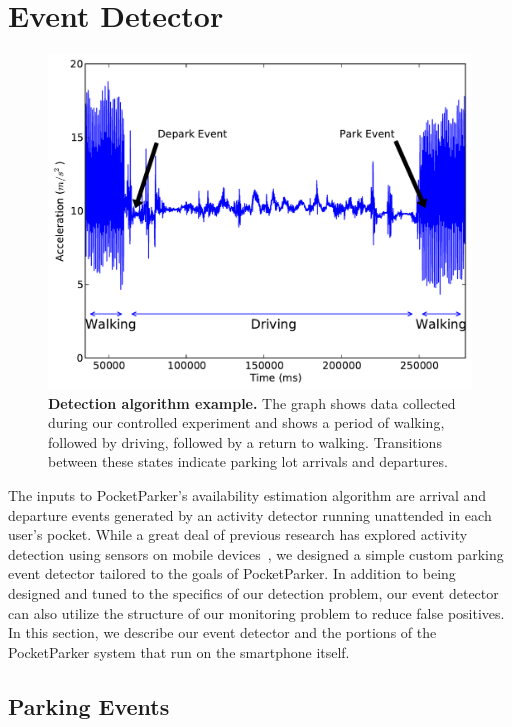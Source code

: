 \section{Event Detector}
\label{sec-detector}

\begin{figure}
\centering
\includegraphics[width=\columnwidth]{./figures/Detection.pdf}

\caption{\textbf{Detection algorithm example.} The graph shows data collected
during our controlled experiment and shows a period of walking, followed by
driving, followed by a return to walking. Transitions between these states
indicate parking lot arrivals and departures.}

\label{fig-detectionexample}
\end{figure}

The inputs to PocketParker's availability estimation algorithm are arrival
and departure events generated by an activity detector running unattended in
each user's pocket. While a great deal of previous research has explored
activity detection using sensors on mobile devices~\cite{FIXME}, we designed a
simple custom parking event detector tailored to the goals of PocketParker.
In addition to being designed and tuned to the specifics of our detection
problem, our event detector can also utilize the structure of our monitoring
problem to reduce false positives. In this section, we describe our event
detector and the portions of the PocketParker system that run on the
smartphone itself.

\subsection{Parking Events}
\label{subsec-goals}

